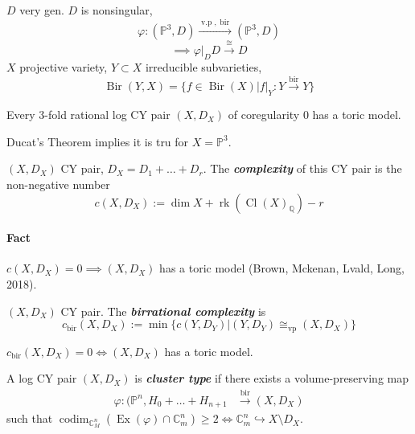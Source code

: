 $D$ very gen. $D$ is nonsingular,
\[\varphi:(\mathbb{P}^3,D)\overset{\operatorname{v.p}, \operatorname{bir}}{\longrightarrow}(\mathbb{P}^3,D)\] 
\[\implies \varphi |_D D\overset{\cong }{\longrightarrow}D\]
$X$ projective variety, $Y\subset X$ irreducible subvarieties,
\[\operatorname{Bir}(Y,X)=\{f\in\operatorname{Bir}(X)|f|_Y:Y\overset{\operatorname{bir}}{\longrightarrow}Y\}\]

\begin{conjecture}[Shokuroo]
	Every 3-fold rational log CY pair $(X,D_X)$ of coregularity 0 has a toric model.
\end{conjecture}

Ducat's Theorem implies it is tru for $X=\mathbb{P}^3$.

\begin{defn}
	$(X,D_X)$ CY pair, $D_X=D_1+\ldots+D_r$. The \textit{\textbf{complexity}} of this CY pair is the non-negative number
	\[c(X,D_X):=\dim X+\operatorname{rk}(\operatorname{Cl}(X)_{\mathbb{Q}})-r\]
\end{defn}

\paragraph{Fact} $c(X,D_X)=0\implies (X,D _X)$ has a toric model (Brown, Mckenan, Lvald, Long, 2018).

\begin{defn}
	$(X,D_X)$ CY pair. The \textit{\textbf{birrational complexity}} is 
	\[c_{\operatorname{bir}}(X,D_X):=\min\{c(Y,D_Y)|(Y,D_Y)\cong_{\operatorname{vp}}(X,D_X)\}\]
\end{defn}

\begin{thm}\leavevmode
	$c_{\operatorname{bir}}(X,D_X)=0\iff(X,D_X)$ has a toric model.
\end{thm}

\begin{defn}
	A log CY pair $(X,D_X)$ is \textit{\textbf{cluster type}} if there exists a volume-preserving map
	\begin{align*}
		\varphi: (\mathbb{P}^n,H_0+\ldots+H_{n+1} &\overset{\operatorname{bir}}{\longrightarrow}(X,D_X) 
	\end{align*}
such that $\operatorname{codim}_{\mathbb{C}^n_M}(\operatorname{Ex}(\varphi )\cap \mathbb{C}^n_m)\geq 2\iff \mathbb{C}^n_m\hookrightarrow X\setminus D_X$.
	
\end{defn}

